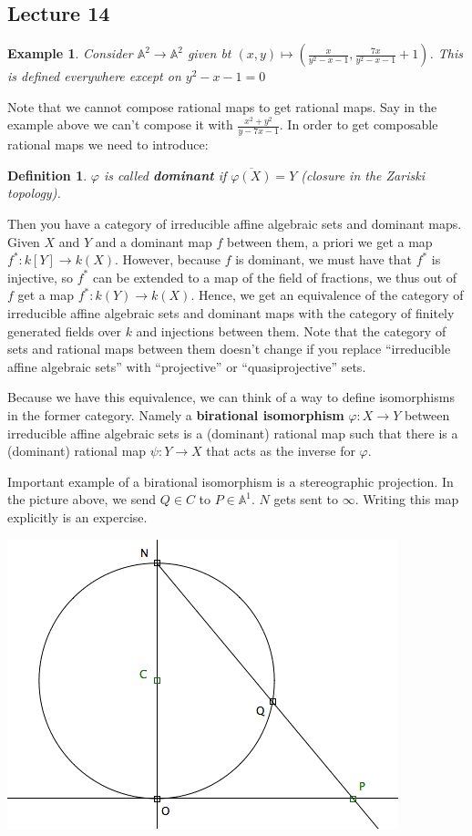 \documentclass[12pt]{article}
\newcommand{\A}{\mathbb{A}}
\renewcommand{\phi}{\varphi}
\newtheorem{definition}{Definition}[section]
\newtheorem*{example}{Example}
\begin{document}
    \subsection{Lecture 14}
    \begin{example}
        Consider $\A^2 \to \A^2$ given bt $(x, y) \mapsto \left( \frac{x}{y^2-x-1}, \frac{7x}{y^2 - x- 1} + 1\right)$. This is defined everywhere except on $y^2 - x -1 = 0$
    \end{example}
    Note that we cannot compose rational maps to get rational maps. Say in the example above we can't compose it with $\frac{x^2 + y^2}{y-7x-1}$.  In order to get composable rational maps we need to introduce:
    \begin{definition}
        $\phi$ is called \textbf{dominant} if $\overline{\phi(X)} = Y$ (closure in the Zariski topology). 
    \end{definition}
    Then you have a category of irreducible affine algebraic sets and dominant maps. Given $X$ and $Y$ and a dominant map $f$ between them, a priori we get a map $f^*: k[Y] \to k(X)$. However, because $f$ is dominant, we must have that $f^*$ is injective, so $f^*$ can be extended to a map of the field of fractions, we thus out of $f$ get a map $f^*: k(Y) \to k(X)$. Hence, we get an equivalence of the category of irreducible affine algebraic sets and dominant maps with the category of finitely generated fields over $k$ and injections between them. Note that the category of sets and rational maps between them doesn't change if you replace ``irreducible affine algebraic sets'' with ``projective'' or ``quasiprojective'' sets. \par 
    Because we have this equivalence, we can think of a way to define isomorphisms in the former category. Namely a \textbf{birational isomorphism} $\phi: X \to Y$ between irreducible affine algebraic sets is a (dominant) rational map such that there is a (dominant) rational map $\psi: Y \to X$ that acts as the inverse for $\phi$. \par 
    Important example of a birational isomorphism is a stereographic projection. In the picture above, we send $Q \in C$ to $P \in \A^1$. $N$ gets sent to $\infty$. Writing this map explicitly is an expercise. 
    \begin{center}
        \includegraphics[width = 0.5\linewidth]{stereo.png}
    \end{center}
\end{document}
